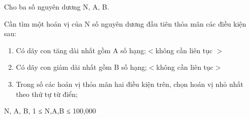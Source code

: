 Cho ba số nguyên dương N, A, B.  

   Cần tìm một hoán vị của N số nguyên dương đầu tiên thỏa mãn các điều kiện sau:  
\begin{enumerate}
	\item     Có dãy con tăng dài nhất gồm A số hạng;$<$không cần liên tục $>$   
	\item     Có dãy con giảm dài nhất gồm B số hạng;$<$không cần liên tục$>$   
	\item     Trong số các hoán vị thỏa mãn hai điều kiện trên, chọn hoán vị nhỏ nhất theo thứ tự từ điển;   
\end{enumerate}

   N, A, B, 1 ≤ N,A,B ≤ 100,000  

\